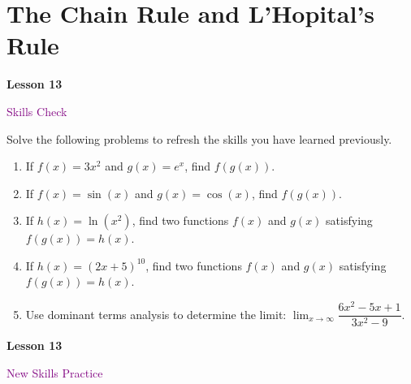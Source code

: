 \documentclass[10pt]{book}
\theoremstyle{definition}
\theoremstyle{remark}
\begin{document}
\section{The Chain Rule and L'Hopital's Rule}
\begin{tcolorbox}[
  width=\textwidth,
  colback=gray!10, %
  colframe=white, %
  boxrule=0pt,    %
  left=1cm,       %
  right=1cm,      %
  sharp corners  %
]

\begin{minipage}[t]{0.5\textwidth}
  \Huge \textbf{Lesson 13}
\end{minipage}%
\hfill
\begin{minipage}[t]{0.5\textwidth}
  \Huge \textcolor{purple}{Skills Check}
\end{minipage}
\end{tcolorbox}

\begin{large}
\noindent
Solve the following problems to refresh the skills you have learned previously.
\begin{enumerate}
\item If $f(x)= 3x^{2}$ and $g(x)=e^{x}$, find $f(g(x))$.\vfil \vfil \vfil
\item If $f(x)= \sin(x)$ and $g(x)=\cos(x)$, find $f(g(x))$.\vfil \vfil \vfil
\item If $h(x) = \ln(x^{2})$, find two functions $f(x)$ and $g(x)$ satisfying $f(g(x))=h(x)$.\vfil \vfil \vfil
\item If $h(x) = (2x+5)^{10}$, find two functions $f(x)$ and $g(x)$ satisfying $f(g(x))=h(x)$.\vfil \vfil \vfil
\item Use dominant terms analysis to determine the limit: $\displaystyle\lim_{x \rightarrow \infty} \dfrac{6x^2 - 5x + 1}{3x^2 - 9}$.\vfil \vfil 
\end{enumerate}
\end{large}
\newpage


\begin{tcolorbox}[
  width=\textwidth,
  colback=gray!10, %
  colframe=white, %
  boxrule=0pt,    %
  left=1cm,       %
  right=1cm,      %
  sharp corners  %
]

\begin{minipage}[t]{0.5\textwidth}
  \Huge \textbf{Lesson 13}
\end{minipage}%
\hfill
\begin{minipage}[t]{0.5\textwidth}
  \Huge\textcolor{purple}{New Skills Practice}
\end{minipage}
\end{tcolorbox}
\end{document}
